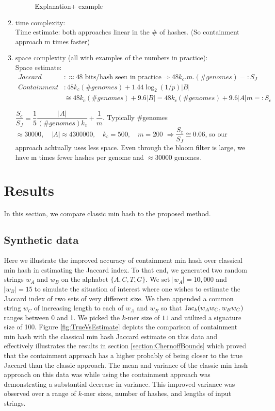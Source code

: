\documentclass[11pt]{amsart}
\theoremstyle{remark}
\numberwithin{equation}{section}
\newcommand{\themethod}{containment min hash }
\DeclareMathOperator{\Jac}{{\rm Jac}}
\newcommand{\SyntheticDataClassic}{\protect }
\newcommand{\SyntheticDataContainment}{\protect }
\begin{document}
\begin{enumerate}
\begin{figure}[!h]
\begin{center}
\end{center}
\caption{Explanation+ example }
\label{fig:DeltaK}%
\end{figure}
\item time complexity:\\
Time estimate: both approaches linear in the \# of hashes. (So containment approach m times faster)
\item space complexity (all with examples of the numbers in practice):\\
Space estimate:
\begin{align*}
Jaccard &: \approx 48 \text{ bits/hash seen in practice}  \Rightarrow 48 k_c.m.(\#genomes)=: S_J\\
Containment &:  48 k_c (\#genomes)+1.44\log_2(1/p) |B| \\
&\cong 48 k_c (\#genomes)+9.6|B| = 48 k_c(\#genomes)+ 9.6 |A| m=: S_c
\end{align*}

$\dfrac{S_c}{S_J}=\dfrac{1}{5}\dfrac{|A|}{(\#genomes) k_c}+\dfrac{1}{m}$.
  Typically \#genomes $\approx 30000, \quad |A|\approx 4300000, \quad k_c=500, \quad m= 200$ 
$\Rightarrow \dfrac{S_c}{S_J}\cong0.06$, so our approach achtually uses less space. Even through the bloom filter is large, we have m times fewer hashes per genome and $\approx 30000 $ genomes.
\end{enumerate}


\section{Results}
In this section, we compare classic min hash to the proposed method.
\subsection{Synthetic data}
\label{section:SyntheticData}
Here we illustrate the improved accuracy of \themethod over classical min hash in estimating the Jaccard index. To that end, we generated two random strings $w_A$ and $w_B$ on the alphabet $\{A,C,T,G\}$. We set $|w_A|= 10,000$ and $|w_B| = 15$ to simulate the situation of interest where one wishes to estimate the Jaccard index of two sets of very different size. We then appended a common string $w_C$ of increasing length to each of $w_A$ and $w_B$ so that $\Jac_k(w_Aw_C, w_Bw_C)$ ranges between 0 and 1. We picked the $k$-mer size of $11$ and utilized a signature size of 100. Figure \ref{fig:TrueVsEstimate} depicts the comparison of \themethod with the classical min hash Jaccard estimate on this data and effectively illustrates the results in section \ref{section:ChernoffBounds} which proved that the containment approach has a higher probably of being closer to the true Jaccard than the classic approach. The mean and variance of the classic min hash approach on this data was \SyntheticDataClassic while using the containment approach was \SyntheticDataContainment demonstrating a substantial decrease in variance. This improved variance was observed over a range of $k$-mer sizes, number of hashes, and lengths of input strings.
\end{document}

